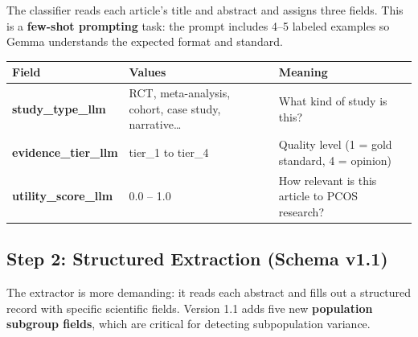 \documentclass[11pt,a4paper]{article}
\begin{document}
The classifier reads each article's title and abstract and assigns three fields.
This is a \textbf{few-shot prompting} task: the prompt includes 4--5 labeled examples
so Gemma understands the expected format and standard.

\begin{tabularx}{\linewidth}{>{\bfseries\small}p{3.2cm} >{\small}p{2.8cm} >{\small}X}
\toprule
\rowcolor{Teal!15}
\textbf{Field} & \textbf{Values} & \textbf{Meaning} \\
\midrule
study\_type\_llm & RCT, meta-analysis, cohort, case study, narrative\ldots & What kind of study is this? \\
evidence\_tier\_llm & tier\_1 to tier\_4 & Quality level (1 = gold standard, 4 = opinion) \\
utility\_score\_llm & 0.0 -- 1.0 & How relevant is this article to PCOS research? \\
\bottomrule
\end{tabularx}

\subsection{Step 2: Structured Extraction (Schema v1.1)}

The extractor is more demanding: it reads each abstract and fills out a structured
record with specific scientific fields. Version 1.1 adds five new \textbf{population
subgroup fields}, which are critical for detecting subpopulation variance.
\end{document}
